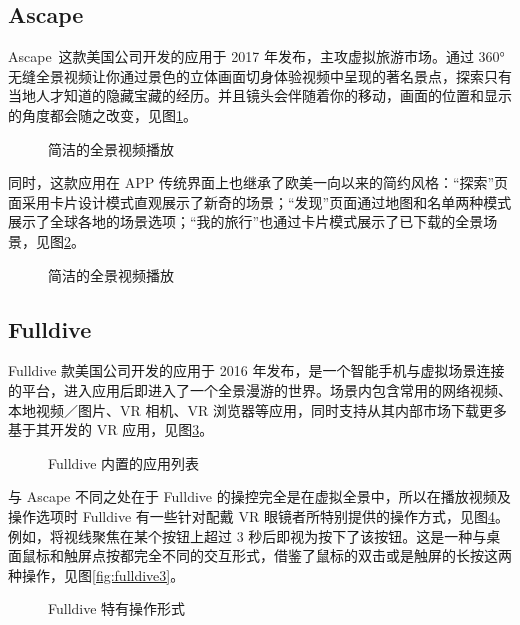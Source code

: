 \subsection{Ascape}

Ascape 这款美国公司开发的应用于 2017 年发布，主攻虚拟旅游市场。通过 360° 无缝全景视频让你通过景色的立体画面切身体验视频中呈现的著名景点，探索只有当地人才知道的隐藏宝藏的经历。并且镜头会伴随着你的移动，画面的位置和显示的角度都会随之改变，见图\ref{fig:ascape1}。

\begin{figure}[htp]
\centering
{}
\caption{简洁的全景视频播放}
\label{fig:ascape1}
\end{figure}

同时，这款应用在 APP 传统界面上也继承了欧美一向以来的简约风格：“探索”页面采用卡片设计模式直观展示了新奇的场景；“发现”页面通过地图和名单两种模式展示了全球各地的场景选项；“我的旅行”也通过卡片模式展示了已下载的全景场景，见图\ref{fig:ascape2}。

\begin{figure}[htp]
\centering
{}
\caption{简洁的全景视频播放}
\label{fig:ascape2}
\end{figure}

\subsection{Fulldive}

Fulldive 款美国公司开发的应用于 2016 年发布，是一个智能手机与虚拟场景连接的平台，进入应用后即进入了一个全景漫游的世界。场景内包含常用的网络视频、本地视频／图片、VR 相机、VR 浏览器等应用，同时支持从其内部市场下载更多基于其开发的 VR 应用，见图\ref{fig:fulldive1}。

\begin{figure}[htp]
\centering
{}
\caption{Fulldive 内置的应用列表}
\label{fig:fulldive1}
\end{figure}

与 Ascape 不同之处在于 Fulldive 的操控完全是在虚拟全景中，所以在播放视频及操作选项时 Fulldive 有一些针对配戴 VR 眼镜者所特别提供的操作方式，见图\ref{fig:fulldive2}。例如，将视线聚焦在某个按钮上超过 3 秒后即视为按下了该按钮。这是一种与桌面鼠标和触屏点按都完全不同的交互形式，借鉴了鼠标的双击或是触屏的长按这两种操作，见图\ref{fig:fulldive3}。

\begin{figure}[htp]
\centering
{}
\caption{Fulldive 特有操作形式}
\label{fig:fulldive2}
\end{figure}

